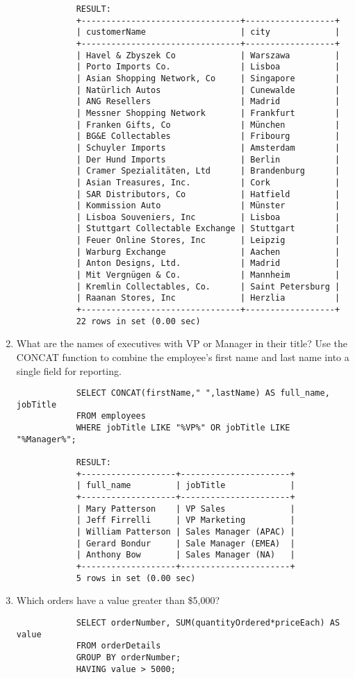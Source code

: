 \documentclass{article}
\begin{document}
\begin{enumerate}
\begin{verbatim}
			RESULT:
			+--------------------------------+------------------+
			| customerName                   | city             |
			+--------------------------------+------------------+
			| Havel & Zbyszek Co             | Warszawa         |
			| Porto Imports Co.              | Lisboa           |
			| Asian Shopping Network, Co     | Singapore        |
			| Natürlich Autos                | Cunewalde        |
			| ANG Resellers                  | Madrid           |
			| Messner Shopping Network       | Frankfurt        |
			| Franken Gifts, Co              | München          |
			| BG&E Collectables              | Fribourg         |
			| Schuyler Imports               | Amsterdam        |
			| Der Hund Imports               | Berlin           |
			| Cramer Spezialitäten, Ltd      | Brandenburg      |
			| Asian Treasures, Inc.          | Cork             |
			| SAR Distributors, Co           | Hatfield         |
			| Kommission Auto                | Münster          |
			| Lisboa Souveniers, Inc         | Lisboa           |
			| Stuttgart Collectable Exchange | Stuttgart        |
			| Feuer Online Stores, Inc       | Leipzig          |
			| Warburg Exchange               | Aachen           |
			| Anton Designs, Ltd.            | Madrid           |
			| Mit Vergnügen & Co.            | Mannheim         |
			| Kremlin Collectables, Co.      | Saint Petersburg |
			| Raanan Stores, Inc             | Herzlia          |
			+--------------------------------+------------------+
			22 rows in set (0.00 sec)
			\end{verbatim}
		\item What are the names of executives with VP or Manager in their title? Use the CONCAT function to combine the employee's first name and last name into a single field for reporting.
			\begin{verbatim}
			SELECT CONCAT(firstName," ",lastName) AS full_name, jobTitle
			FROM employees
			WHERE jobTitle LIKE "%VP%" OR jobTitle LIKE "%Manager%";
			
			RESULT:
			+-------------------+----------------------+
			| full_name         | jobTitle             |
			+-------------------+----------------------+
			| Mary Patterson    | VP Sales             |
			| Jeff Firrelli     | VP Marketing         |
			| William Patterson | Sales Manager (APAC) |
			| Gerard Bondur     | Sale Manager (EMEA)  |
			| Anthony Bow       | Sales Manager (NA)   |
			+-------------------+----------------------+
			5 rows in set (0.00 sec)
			\end{verbatim}
		\item Which orders have a value greater than \$5,000?
			\begin{verbatim}
			SELECT orderNumber, SUM(quantityOrdered*priceEach) AS value
			FROM orderDetails
			GROUP BY orderNumber;
			HAVING value > 5000;
			

\end{verbatim}
\end{enumerate}
\end{document}
